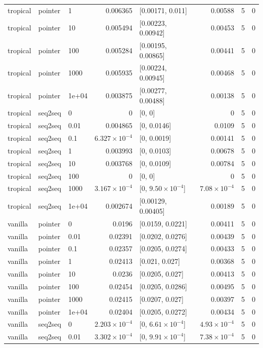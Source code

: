 \documentclass[10pt]{article}
\begin{document}
{\begin{longtable}{lllrlrrr}
tropical & pointer & 1 & 0.006365 & [0.00171, 0.011] & 0.00588 & 5 & 0\\
tropical & pointer & 10 & 0.005494 & [0.00223, 0.00942] & 0.00453 & 5 & 0\\
tropical & pointer & 100 & 0.005284 & [0.00195, 0.00865] & 0.00441 & 5 & 0\\
tropical & pointer & 1000 & 0.005935 & [0.00224, 0.00945] & 0.00468 & 5 & 0\\
tropical & pointer & 1e+04 & 0.003875 & [0.00277, 0.00488] & 0.00138 & 5 & 0\\
tropical & seq2seq & 0 & 0 & [0, 0] & 0 & 5 & 0\\
tropical & seq2seq & 0.01 & 0.004865 & [0, 0.0146] & 0.0109 & 5 & 0\\
tropical & seq2seq & 0.1 & $6.327\times10^{-4}$ & [0, 0.0019] & 0.00141 & 5 & 0\\
tropical & seq2seq & 1 & 0.003993 & [0, 0.0103] & 0.00678 & 5 & 0\\
tropical & seq2seq & 10 & 0.003768 & [0, 0.0109] & 0.00784 & 5 & 0\\
tropical & seq2seq & 100 & 0 & [0, 0] & 0 & 5 & 0\\
tropical & seq2seq & 1000 & $3.167\times10^{-4}$ & [0, $9.50\times10^{-4}$] & $7.08\times10^{-4}$ & 5 & 0\\
tropical & seq2seq & 1e+04 & 0.002674 & [0.00129, 0.00405] & 0.00189 & 5 & 0\\
vanilla & pointer & 0 & 0.0196 & [0.0159, 0.0221] & 0.00411 & 5 & 0\\
vanilla & pointer & 0.01 & 0.02391 & [0.0202, 0.0276] & 0.00439 & 5 & 0\\
vanilla & pointer & 0.1 & 0.02357 & [0.0205, 0.0274] & 0.00433 & 5 & 0\\
vanilla & pointer & 1 & 0.02413 & [0.021, 0.027] & 0.00368 & 5 & 0\\
vanilla & pointer & 10 & 0.0236 & [0.0205, 0.027] & 0.00413 & 5 & 0\\
vanilla & pointer & 100 & 0.02454 & [0.0205, 0.0286] & 0.00495 & 5 & 0\\
vanilla & pointer & 1000 & 0.02415 & [0.0207, 0.027] & 0.00397 & 5 & 0\\
vanilla & pointer & 1e+04 & 0.02404 & [0.0205, 0.0272] & 0.00434 & 5 & 0\\
vanilla & seq2seq & 0 & $2.203\times10^{-4}$ & [0, $6.61\times10^{-4}$] & $4.93\times10^{-4}$ & 5 & 0\\
vanilla & seq2seq & 0.01 & $3.302\times10^{-4}$ & [0, $9.91\times10^{-4}$] & $7.38\times10^{-4}$ & 5 & 0\\

\end{longtable}}
\end{document}
